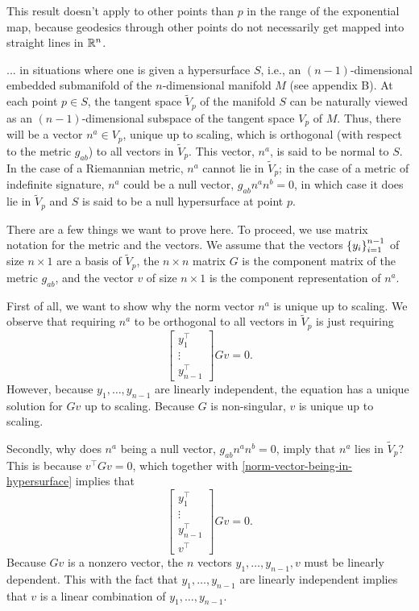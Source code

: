 \documentclass{note}
\numberwithin{equation}{chapter}
\begin{document}
This result doesn't apply to other points than $p$ in the range of the exponential
map, because geodesics through other points do not necessarily get mapped into
straight lines in $\mathbb{R}^n$.

\begin{quotebox}
  ... in situations where one is given a hypersurface $S$, i.e., an $(n -
    1)$-dimensional embedded submanifold of the $n$-dimensional manifold $M$ (see
  appendix B). At each point $p \in S$, the tangent space $\tilde{V}_p$ of the
  manifold $S$ can be naturally viewed as an $(n - 1)$-dimensional subspace of
  the tangent space $V_p$ of $M$. Thus, there will be a vector $n^a \in V_p$,
  unique up to scaling, which is orthogonal (with respect to the metric $g_{ab}$)
  to all vectors in $\tilde{V}_p$. This vector, $n^a$, is said to be normal to
  $S$. In the case of a Riemannian metric, $n^a$ cannot lie in $\tilde{V}_p$; in
  the case of a metric of indefinite signature, $n^a$ could be a null vector,
  $g_{ab}n^a n^b = 0$, in which case it does lie in $\tilde{V}_p$ and $S$ is said
  to be a null hypersurface at point $p$.
\end{quotebox}

There are a few things we want to prove here. To proceed, we use matrix notation for
the metric and the vectors. We assume that the vectors $\set{y_i}_{i=1}^{n-1}$ of
size $n\times 1$ are a basis of $\tilde{V}_p$, the $n\times n$ matrix $G$ is the
component matrix of the metric $g_{ab}$, and the vector $v$ of size $n\times 1$ is
the component representation of $n^a$.

First of all, we want to show why the norm vector $n^a$ is unique up to scaling. We
observe that requiring $n^a$ to be orthogonal to all vectors in $\tilde{V}_p$ is
just requiring
\begin{equation}
  \begin{bmatrix}
    y_1^\top \\
    \vdots   \\
    y_{n-1}^\top
  \end{bmatrix}
  Gv = 0. \label{norm-vector-being-in-hypersurface}
\end{equation}
However, because $y_1, \dots, y_{n-1}$ are linearly independent, the equation has a
unique solution for $Gv$ up to scaling. Because $G$ is non-singular, $v$ is unique
up to scaling.

Secondly, why does $n^a$ being a null vector, $g_{ab}n^a n^b = 0$, imply that $n^a$
lies in $\tilde{V}_p$? This is because $v^\top Gv = 0$, which together with
\eqref{norm-vector-being-in-hypersurface} implies that
\begin{equation*}
  \begin{bmatrix}
    y_1^\top     \\
    \vdots       \\
    y_{n-1}^\top \\
    v^\top
  \end{bmatrix}
  Gv = 0.
\end{equation*}
Because $Gv$ is a nonzero vector, the $n$ vectors $y_1, \dots, y_{n-1}, v$ must be
linearly dependent. This with the fact that $y_1, \dots, y_{n-1}$ are linearly
independent implies that $v$ is a linear combination of $y_1, \dots, y_{n-1}$.
\end{document}

